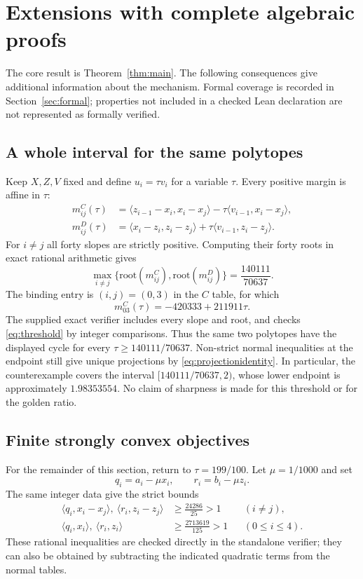\documentclass[11pt,a4paper]{article}
\theoremstyle{remark}
\newcommand{\ip}[2]{\langle #1,#2\rangle}
\begin{document}
\section{Extensions with complete algebraic proofs}\label{sec:extensions}
The core result is Theorem~\ref{thm:main}. The following consequences give additional information about the mechanism. Formal coverage is recorded in Section~\ref{sec:formal}; properties not included in a checked Lean declaration are not represented as formally verified.

\subsection{A whole interval for the same polytopes}
Keep $X,Z,V$ fixed and define $u_i=\tau v_i$ for a variable $\tau$. Every positive margin is affine in $\tau$:
\begin{align*}
m^C_{ij}(\tau)&=\ip{z_{i-1}-x_i}{x_i-x_j}
-\tau\ip{v_{i-1}}{x_i-x_j},\\
m^D_{ij}(\tau)&=\ip{x_i-z_i}{z_i-z_j}
+\tau\ip{v_{i-1}}{z_i-z_j}.
\end{align*}
For $i\ne j$ all forty slopes are strictly positive. Computing their forty roots in exact rational arithmetic gives
\begin{equation}\label{eq:threshold}
\max_{i\ne j}\{\text{root}(m^C_{ij}),\text{root}(m^D_{ij})\}
=\frac{140111}{70637}.
\end{equation}
The binding entry is $(i,j)=(0,3)$ in the $C$ table, for which
\[
m^C_{03}(\tau)=-420333+211911\tau.
\]
The supplied exact verifier includes every slope and root, and checks \eqref{eq:threshold} by integer comparisons. Thus the same two polytopes have the displayed cycle for every $\tau\ge140111/70637$. Non-strict normal inequalities at the endpoint still give unique projections by \eqref{eq:projectionidentity}. In particular, the counterexample covers the interval $[140111/70637,2)$, whose lower endpoint is approximately $1.98353554$. No claim of sharpness is made for this threshold or for the golden ratio.

\subsection{Finite strongly convex objectives}
For the remainder of this section, return to $\tau=199/100$. Let $\mu=1/1000$ and set
\[
q_i=a_i-\mu x_i,\qquad r_i=b_i-\mu z_i.
\]
The same integer data give the strict bounds
\begin{align}
\ip{q_i}{x_i-x_j},\ \ip{r_i}{z_i-z_j}
&\ge \frac{24286}{25}>1 &&(i\ne j),\label{eq:strongcross}\\
\ip{q_i}{x_i},\ \ip{r_i}{z_i}
&\ge \frac{2713619}{125}>1 &&(0\le i\le4).\label{eq:strongorigin}
\end{align}
These rational inequalities are checked directly in the standalone verifier; they can also be obtained by subtracting the indicated quadratic terms from the normal tables.
\end{document}
